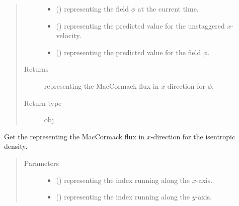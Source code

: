 \documentclass[letterpaper,10pt,english]{sphinxmanual}
\begin{document}
\begin{fulllineitems}
\begin{fulllineitems}
\begin{quote}
\begin{description}
\begin{itemize}
\item {} 
 () \textendash{}  representing the field \(\phi\) at the current time.

\item {} 
 () \textendash{}  representing the predicted value for the unstaggered \(x\)-velocity.

\item {} 
 () \textendash{}  representing the predicted value for the field \(\phi\).

\end{itemize}

\item[{Returns}] \leavevmode
{} representing the MacCormack flux in \(x\)-direction for \(\phi\).

\item[{Return type}] \leavevmode
obj

\end{description}\end{quote}

\end{fulllineitems}


\begin{fulllineitems}
\label{\detokenize{api:dycore.flux_isentropic_maccormack.FluxIsentropicMacCormack._get_maccormack_flux_x_density}}
Get the  representing the MacCormack flux in \(x\)-direction for the
isentropic density.
\begin{quote}\begin{description}
\item[{Parameters}] \leavevmode\begin{itemize}
\item {} 
 () \textendash{}  representing the index running along the \(x\)-axis.

\item {} 
 () \textendash{}  representing the index running along the \(y\)-axis.


\end{itemize}
\end{description}
\end{quote}
\end{fulllineitems}
\end{fulllineitems}
\end{document}
